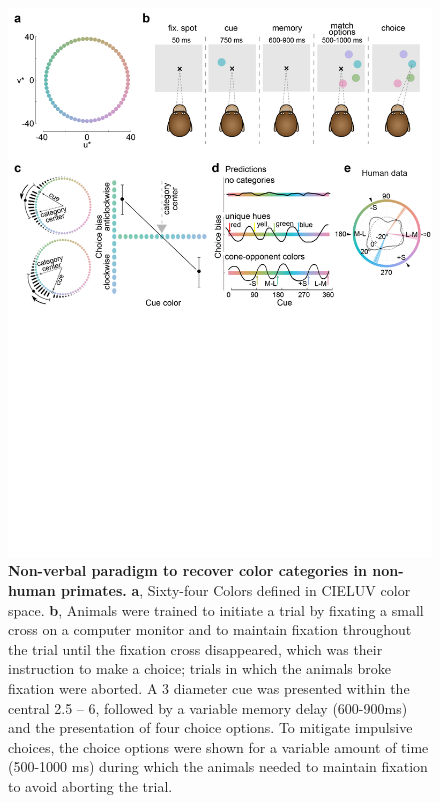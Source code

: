 \documentclass[9pt,biorxiv,lineno,onehalfspacing]{lapreprint}
\begin{document}
\begin{refsection}
\begin{figure}
    \begin{fullwidth}
    \centering
    \includegraphics[width=\textwidth+4cm,trim={0 12.5cm 0 0},clip]{Outputs/Paper/Figures/flat/F1_ParadigmPredictions_9.png}
    \caption{\textbf{Non-verbal paradigm to recover color categories in non-human primates.}
    \textbf{a}, Sixty-four Colors defined in CIELUV color space. 
	\textbf{b}, Animals were trained to initiate a trial by fixating a small cross on a computer monitor and to maintain fixation throughout the trial until the fixation cross disappeared, which was their instruction to make a choice; trials in which the animals broke fixation were aborted. 
	A 3\degree{} diameter cue was presented within the central 2.5 – 6\degree{}, followed by a variable memory delay (600-900ms) and the presentation of four choice options. 
	To mitigate impulsive choices, the choice options were shown for a variable amount of time (500-1000 ms) during which the animals needed to maintain fixation to avoid aborting the trial. 
}
\end{fullwidth}
\end{figure}
\end{refsection}
\end{document}
